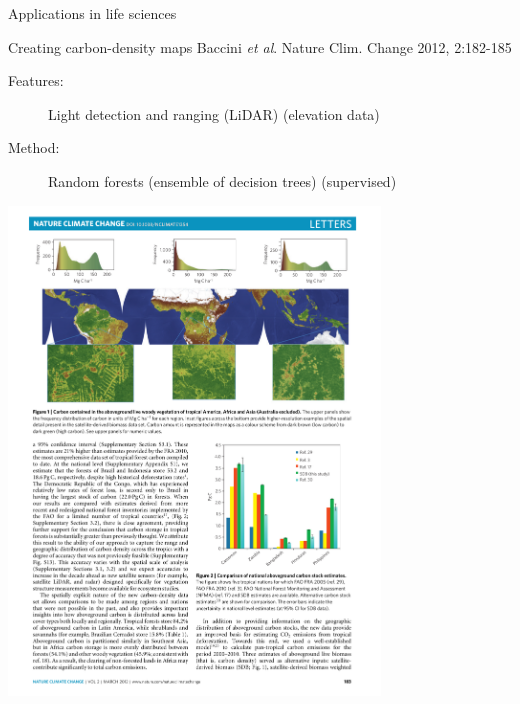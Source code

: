 \documentclass[pdf]{beamer}
\begin{document}
\begin{frame}{Applications in life sciences}
\begin{exampleblock}{Creating carbon-density maps \vskip-1mm{\tiny Baccini \textit{et al}. Nature Clim. Change 2012, 2:182-185}}
\begin{description}
	\item[Features:] Light detection and ranging (LiDAR) (elevation data)
	\item[Method:] Random forests (ensemble of decision trees) (supervised)
\end{description}
\begin{center}
	\includegraphics[width=0.74\textwidth]{baccini.pdf}
\end{center}
\end{exampleblock}
\end{frame}
\end{document}
